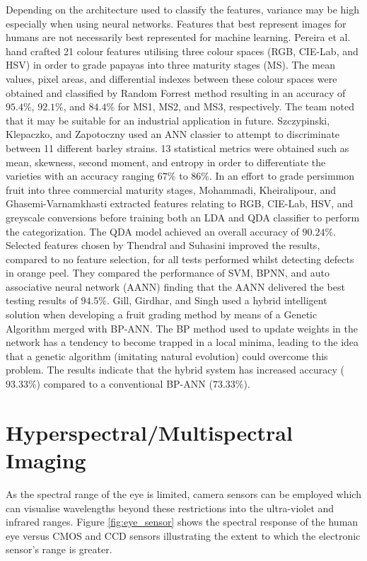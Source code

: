 \documentclass[fleqn,twoside,12pt]{report}
\begin{document}
Depending on the architecture used to classify the features, variance may be high especially when using neural networks. Features that best represent images for humans are not necessarily best represented for machine learning. Pereira et al.\cite{pereira} hand crafted 21 colour features utilising three colour spaces (RGB, CIE-Lab, and HSV) in order to grade papayas into three maturity stages (MS). The mean values, pixel areas, and differential indexes between these colour spaces were obtained and classified by Random Forrest method resulting in an accuracy of $95.4\%$, $92.1\%$, and $84.4\%$ for MS1, MS2, and MS3, respectively. The team noted that it may be suitable for an industrial application in future. Szczypinski, Klepaczko, and Zapotoczny \cite{szczypinski} used an ANN classier to attempt to discriminate between 11 different barley strains. 13 statistical metrics were obtained such as mean, skewness, second moment, and entropy in order to differentiate the varieties with an accuracy ranging $67\%$ to $86\%$. In an effort to grade persimmon fruit into three commercial maturity stages, Mohammadi, Kheiralipour, and Ghasemi-Varnamkhasti \cite{mohammadi} extracted features relating to RGB, CIE-Lab, HSV, and greyscale conversions before training both an LDA and QDA classifier to perform the categorization. The QDA model achieved an overall accuracy of $90.24\%$. Selected features chosen by Thendral and Suhasini \cite{thendral} improved the results, compared to no feature selection, for all tests performed whilst detecting defects in orange peel. They compared the performance of SVM, BPNN, and auto associative neural network (AANN) finding that the AANN delivered the best testing results of $94.5\%$. Gill, Girdhar, and Singh \cite{gill} used a hybrid intelligent solution when developing a fruit grading method by means of a Genetic Algorithm merged with BP-ANN. The BP method used to update weights in the network has a tendency to become trapped in a local minima, leading to the idea that a genetic algorithm (imitating natural evolution) could overcome this problem. The results indicate that the hybrid system has increased accuracy ($93.33\%$) compared to a conventional BP-ANN ($73.33\%$).  


\section{Hyperspectral/Multispectral Imaging}
\label{sec:lit_hyperspec}

As the spectral range of the eye is limited, camera sensors can be employed which can visualise wavelengths beyond these restrictions into the ultra-violet and infrared ranges. Figure \ref{fig:eye_sensor} shows the spectral response of the human eye versus CMOS and CCD sensors illustrating the extent to which the electronic sensor's range is greater.
\end{document}

